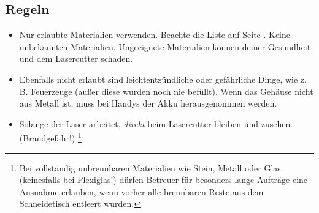 \documentclass{\basedir/fablab-document}
\makeatletter
\newcommand{\smaller}{\ifdim\f@size pt>10pt \small \fi}
\newcommand{\english}[1]{{\smaller \color{gray} \itshape #1}}
\renewcommand{\english}[1]{}
\newcommand{\footnoteref}[1]{\textsuperscript{\ref{#1}}}
\makeatother
\begin{document}
	\subsection{Regeln \english{Rules}}
	\begin{itemize}
		\item Nur erlaubte Materialien verwenden. Beachte die Liste auf Seite \pageref{sec:material}. Keine unbekannten Materialien. Ungeeignete Materialien können deiner Gesundheit und dem Lasercutter schaden.

            \english{Only use allowed materials. Check the list on page \pageref{sec:material}. No unknown materials. Unsuitable materials can damage your health and the lasercutter.}

		\item Ebenfalls nicht erlaubt sind leichtentzündliche oder gefährliche Dinge, wie z.\,B. Feuer\-zeuge (außer diese wurden noch nie befüllt). Wenn das Gehäuse nicht aus Metall ist, muss bei Handys der Akku herausgenommen werden.

            \english{TODO: The english translation of this document is not yet finished. Please ask the advisors for a translation.}

		\item Solange der Laser arbeitet, \emph{direkt} beim Lasercutter bleiben und zusehen. (Brandgefahr!)
            \footnote{\label{footnote:rules:nonflammable}
                Bei vollständig unbrennbaren Materialien wie Stein, Metall oder Glas (keinesfalls bei Plexiglas!) dürfen Betreuer für besonders lange Aufträge eine Ausnahme erlauben, wenn vorher alle brennbaren Reste aus dem Schneidetisch entleert wurden.

                \english{TODO translate the footnote}
            }

            \english{TODO translate the main text\footnoteref{footnote:rules:nonflammable}}


\end{itemize}
\end{document}

